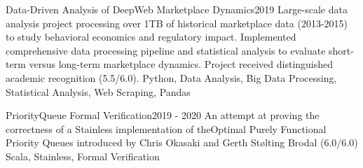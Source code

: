 \begin{projects}

\project
{Data-Driven Analysis of DeepWeb Marketplace Dynamics}{2019}
{}
{Large-scale data analysis project processing over 1TB of historical marketplace data (2013-2015) to study behavioral economics and regulatory impact. Implemented comprehensive data processing pipeline and statistical analysis to evaluate short-term versus long-term marketplace dynamics. Project received distinguished academic recognition (5.5/6.0).}
{Python, Data Analysis, Big Data Processing, Statistical Analysis, Web Scraping, Pandas}

\project
{PriorityQueue Formal Verification}{2019 - 2020}
{}
{An attempt at proving the correctness of a Stainless implementation of theOptimal Purely Functional Priority Queues introduced by Chris Okasaki and Gerth Stølting Brodal (6.0/6.0)}
{Scala, Stainless, Formal Verification}


\end{projects}
